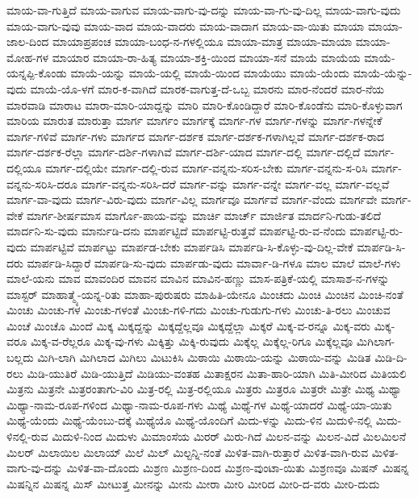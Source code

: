 {ಮಾಯ-ವಾ-ಗುತ್ತಿದೆ
ಮಾಯ-ವಾಗುವ
ಮಾಯ-ವಾಗು-ವು-ದನ್ನು
ಮಾಯ-ವಾ-ಗು-ವು-ದಿಲ್ಲ
ಮಾಯ-ವಾಗು-ವುದು
ಮಾಯ-ವಾಗು-ವುವು
ಮಾಯ-ವಾದ
ಮಾಯ-ವಾದರು
ಮಾಯ-ವಾದಾಗ
ಮಾಯ-ವಾ-ಯಿತು
ಮಾಯಾ
ಮಾಯಾ-ಜಾಲ-ದಿಂದ
ಮಾಯಾಪ್ರಪಂಚ
ಮಾಯಾ-ಬಂಧ-ನ-ಗಳಲ್ಲಿಯೂ
ಮಾಯಾ-ಮಾತ್ರ
ಮಾಯಾ-ಮಾಯಾ
ಮಾಯಾ-ಮೋಹ-ಗಳ
ಮಾಯಾರ
ಮಾಯಾ-ರಾ-ಹಿತ್ಯ
ಮಾಯಾ-ಶಕ್ತಿ-ಯಿಂದ
ಮಾಯಾ-ಸನೆ
ಮಾಯೆ
ಮಾಯೆಯ
ಮಾಯೆ-ಯನ್ನಪ್ಪಿ-ಕೊಂಡು
ಮಾಯೆ-ಯನ್ನು
ಮಾಯೆ-ಯಲ್ಲಿ
ಮಾಯೆ-ಯಿಂದ
ಮಾಯೆಯು
ಮಾಯೆ-ಯೆಂದು
ಮಾಯೆ-ಯೆನ್ನು-ವುದು
ಮಾಯೆ-ಯೊ-ಳಗೆ
ಮಾರ-ಕ-ವಾಗಿದೆ
ಮಾರಕ-ವಾಗುತ್ತ-ದೆ-ಒಬ್ಬ
ಮಾರನು
ಮಾರ-ನೆಂದರೆ
ಮಾರ-ನೆಯ
ಮಾರವಾಡಿ
ಮಾರಾಟ
ಮಾರಾ-ಮಾರಿ-ಯಾದ್ದನ್ನು
ಮಾರಿ
ಮಾರಿ-ಕೊಂಡಿದ್ದಾರೆ
ಮಾರಿ-ಕೊಂಡೆನು
ಮಾರಿ-ಕೊಳ್ಳುವಾಗ
ಮಾರಿಯ
ಮಾರುತ
ಮಾರುತ್ತಾ
ಮಾರ್ಗ
ಮಾರ್ಗಂ
ಮಾರ್ಗಕ್ಕೆ
ಮಾರ್ಗ-ಗಳ
ಮಾರ್ಗ-ಗಳನ್ನು
ಮಾರ್ಗ-ಗಳನ್ನೇಕೆ
ಮಾರ್ಗ-ಗಳಿವೆ
ಮಾರ್ಗ-ಗಳು
ಮಾರ್ಗದ
ಮಾರ್ಗ-ದರ್ಶಕ
ಮಾರ್ಗ-ದರ್ಶಕ-ಗಳಾಗಿಲ್ಲವೆ
ಮಾರ್ಗ-ದರ್ಶಕ-ರಾದ
ಮಾರ್ಗ-ದರ್ಶಕ-ರೆಲ್ಲಾ
ಮಾರ್ಗ-ದರ್ಶಿ-ಗಳಾಗಿವೆ
ಮಾರ್ಗ-ದರ್ಶಿ-ಯಾದ
ಮಾರ್ಗ-ದಲ್ಲಿ
ಮಾರ್ಗ-ದಲ್ಲಿದೆ
ಮಾರ್ಗ-ದಲ್ಲಿಯೂ
ಮಾರ್ಗ-ದಲ್ಲಿಯೇ
ಮಾರ್ಗ-ದಲ್ಲಿ-ರುವ
ಮಾರ್ಗ-ವನ್ನನು-ಸರಿಸ-ಬೇಕು
ಮಾರ್ಗ-ವನ್ನನು-ಸ-ರಿಸಿ
ಮಾರ್ಗ-ವನ್ನನು-ಸರಿಸಿ-ದರೂ
ಮಾರ್ಗ-ವನ್ನನು-ಸರಿಸಿ-ದರೆ
ಮಾರ್ಗ-ವನ್ನು
ಮಾರ್ಗ-ವನ್ನೇ
ಮಾರ್ಗ-ವಲ್ಲ
ಮಾರ್ಗ-ವಲ್ಲವೆ
ಮಾರ್ಗ-ವಾ-ವುದು
ಮಾರ್ಗ-ವಿರು-ವುದು
ಮಾರ್ಗ-ವಿಲ್ಲ
ಮಾರ್ಗವೂ
ಮಾರ್ಗವೆ
ಮಾರ್ಗ-ವೆಂದು
ಮಾರ್ಗವೇ
ಮಾರ್ಗ-ವೇಕೆ
ಮಾರ್ಗ-ಶೀರ್ಷಮಾಸ
ಮಾರ್ಗೊ-ಪಾಯ-ವನ್ನು
ಮಾರ್ಚಿ
ಮಾರ್ಚ್
ಮಾರ್ಜಿತ
ಮಾರ್ದನಿ-ಗುಡು-ತಲಿದೆ
ಮಾರ್ದನಿ-ಸು-ವುದು
ಮಾರ್ನುಡಿ-ದನು
ಮಾರ್ಪಟ್ಟಿದೆ
ಮಾರ್ಪಟ್ಟಿ-ರುತ್ತವೆ
ಮಾರ್ಪಟ್ಟಿ-ರು-ವ-ನೆಂದು
ಮಾರ್ಪಟ್ಟಿ-ರು-ವುದು
ಮಾರ್ಪಟ್ಟಿವೆ
ಮಾರ್ಪಟ್ಟು
ಮಾರ್ಪಡ-ಬೇಕು
ಮಾರ್ಪಡಿಸಿ
ಮಾರ್ಪಡಿ-ಸಿ-ಕೊಳ್ಳು-ವು-ದಿಲ್ಲ-ವೇಕೆ
ಮಾರ್ಪಡಿ-ಸಿ-ದರು
ಮಾರ್ಪಡಿ-ಸಿದ್ದಾರೆ
ಮಾರ್ಪಡಿ-ಸು-ವುದು
ಮಾರ್ಪಡು-ವುದು
ಮಾರ್ವಾ-ಡಿ-ಗಳೂ
ಮಾಲ
ಮಾಲೆ
ಮಾಲೆ-ಗಳು
ಮಾಲೆ-ಯನು
ಮಾವ
ಮಾವಂದಿರ
ಮಾವನ
ಮಾವಿನ
ಮಾವಿನ-ಹಣ್ಣು
ಮಾಸ-ಪತ್ರಿಕೆ-ಯಲ್ಲಿ
ಮಾಸಾಶ-ನ-ಗಳನ್ನು
ಮಾಸ್ಟರ್
ಮಾಹಾತ್ಮ್ಯೆ-ಯನ್ನ-ರಿತು
ಮಾಹಾ-ಪುರುಷರು
ಮಾಹಿತಿ-ಯೇನೂ
ಮಿಂಚದು
ಮಿಂಚಿ
ಮಿಂಚಿನ
ಮಿಂಚಿ-ನಂತೆ
ಮಿಂಚು
ಮಿಂಚು-ಗಳ
ಮಿಂಚು-ಗಳಂತೆ
ಮಿಂಚು-ಗಳಿ-ಗದು
ಮಿಂಚು-ಗುಡುಗು-ಗಳು
ಮಿಂಚು-ತಿ-ರಲು
ಮಿಂಚುವ
ಮಿಂಚೆ
ಮಿಂಚೊ
ಮಿಂದೆ
ಮಿಕ್ಕ
ಮಿಕ್ಕದ್ದನ್ನು
ಮಿಕ್ಕದ್ದೆಲ್ಲವೂ
ಮಿಕ್ಕದ್ದೆಲ್ಲಾ
ಮಿಕ್ಕರೆ
ಮಿಕ್ಕ-ವ-ರನ್ನೂ
ಮಿಕ್ಕ-ವರು
ಮಿಕ್ಕ-ವರೂ
ಮಿಕ್ಕ-ವ-ರೆಲ್ಲರೂ
ಮಿಕ್ಕ-ವು-ಗಳು
ಮಿಕ್ಕಿತ್ತು
ಮಿಕ್ಕಿ-ರುವುದು
ಮಿಕ್ಕೆಲ್ಲ
ಮಿಕ್ಕೆಲ್ಲ-ರಿಗೂ
ಮಿಕ್ಕೆಲ್ಲವೂ
ಮಿಗಿಲಾಗ-ಬಲ್ಲದು
ಮಿಗಿ-ಲಾಗಿ
ಮಿಗಿಲಾದ
ಮಿಗಿಲು
ಮಿಟುಕಿಸಿ
ಮಿಠಾಯಿ
ಮಿಠಾಯಿ-ಯನ್ನು
ಮಿಠಾಯಿ-ವನ್ನು
ಮಿಡಿತ
ಮಿಡಿ-ದಿ-ರಲು
ಮಿಡಿ-ಯುತಿರೆ
ಮಿಡಿ-ಯುತ್ತಿದೆ
ಮಿಡಿಯು-ವಂತಹ
ಮಿತಾಕ್ಷರನ
ಮಿತಾ-ಹಾರಿ-ಯಾಗಿ
ಮಿತಿ-ಮೀರಿದ
ಮಿತಿಯಲಿ
ಮಿತ್ರನು
ಮಿತ್ರನೇ
ಮಿತ್ರರಂತಾಗು-ವಿರಿ
ಮಿತ್ರ-ರಲ್ಲಿ
ಮಿತ್ರ-ರಲ್ಲಿಯೂ
ಮಿತ್ರರು
ಮಿತ್ರರೂ
ಮಿತ್ರರೇ
ಮಿತ್ರೇ
ಮಿಥ್ಯ
ಮಿಥ್ಯಾ
ಮಿಥ್ಯಾ-ನಾಮ-ರೂಪ-ಗಳಿಂದ
ಮಿಥ್ಯಾ-ನಾಮ-ರೂಪ-ಗಳು
ಮಿಥ್ಯೆ
ಮಿಥ್ಯೆ-ಗಳ
ಮಿಥ್ಯೆ-ಯಾದರೆ
ಮಿಥ್ಯೆ-ಯಾ-ಯಿತು
ಮಿಥ್ಯೆ-ಯೆಂದು
ಮಿಥ್ಯೆ-ಯೆಂಬು-ದಕ್ಕೆ
ಮಿಥ್ಯೆಯೊ
ಮಿಥ್ಯೆ-ಯೊಂದಿಗೆ
ಮಿದು-ಳನ್ನು
ಮಿದು-ಳಿನ
ಮಿದುಳಿ-ನಲ್ಲಿ
ಮಿದು-ಳಿನಲ್ಲಿ-ರುವ
ಮಿದುಳಿ-ನಿಂದ
ಮಿದುಳು
ಮಿಮಾಂಸೆಯ
ಮಿರರ್
ಮಿರು-ಗಿದೆ
ಮಿಲನ-ವನ್ನು
ಮಿಲನ-ವಿದೆ
ಮಿಲಮಿಲನೆ
ಮಿಲರ್
ಮಿಲಾಯಿಲ
ಮಿಲಾಯ್
ಮಿಲೆ
ಮಿಲ್
ಮಿಲ್ಟನ್ನಿ-ನಂತೆ
ಮಿಳಿತ-ವಾಗಿ-ರುತ್ತಾರೆ
ಮಿಳಿತ-ವಾಗಿ-ರುವ
ಮಿಳಿತ-ವಾಗು-ವು-ದನ್ನು
ಮಿಳಿತ-ವಾ-ದೊಂದು
ಮಿಶ್ರಣ
ಮಿಶ್ರಣ-ದಿಂದ
ಮಿಶ್ರಣ-ವುಂಟಾ-ಯಿತು
ಮಿಶ್ರಣವೂ
ಮಿಷನ್
ಮಿಷನ್ನ
ಮಿಷನ್ನಿನ
ಮಿಷನ್ನ
ಮಿಸ್
ಮೀಟುತ್ತ
ಮೀನನ್ನು
ಮೀನು
ಮೀರಾ
ಮೀರಿ
ಮೀರಿದ
ಮೀರಿ-ದ-ವರು
ಮೀರಿ-ದುದು
}
